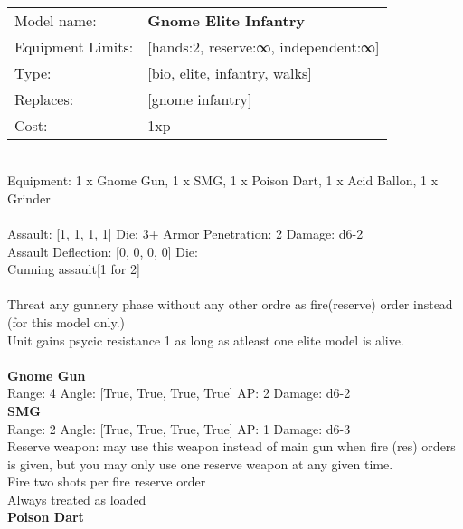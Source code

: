  
\ \\

\noindent
\begin{tabular}{ll}
Model name: &{\bf Gnome Elite Infantry } \\
Equipment Limits: &[hands:2, reserve:∞, independent:∞] \\
Type: &[bio, elite, infantry, walks] \\
Replaces: &[gnome infantry] \\
Cost: & 1xp\\
\end{tabular}
\ \\
Equipment: 1 x Gnome Gun, 1 x SMG, 1 x Poison Dart, 1 x Acid Ballon, 1 x Grinder \\
\ \\
Assault: [1, 1, 1, 1] Die: 3+ Armor Penetration: 2 Damage: d6-2 \\
Assault Deflection: [0, 0, 0, 0] Die: \\
\indent Cunning assault[1 for 2]\\ 
 
\ \\
Threat any gunnery phase without any other ordre as fire(reserve) order instead (for this model only.)\\ 
Unit gains psycic resistance 1 as long as atleast one elite model is alive.\\ 

\ \\
{\bf Gnome Gun } \\



Range: 4  Angle: [True, True, True, True] AP: 2 Damage: d6-2 \\




{\bf SMG } \\



Range: 2  Angle: [True, True, True, True] AP: 1 Damage: d6-3 \\
Reserve weapon: may use this weapon instead of main gun when fire (res) orders is given, but you may only use one reserve weapon at any given time.\\ 
Fire two shots per fire reserve order\\ 
Always treated as loaded\\ 




{\bf Poison Dart } \\



